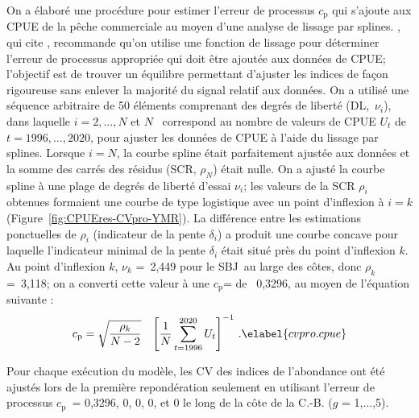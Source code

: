 \documentclass[11pt]{book}
\def\vsd{\vspace*{1ex}}     %
\renewcommand{\eb}{\vsd \vsd \begin{eqnarray}}
\renewcommand{\ee}{\end{eqnarray} \vsd }
\begin{document}
On a \'{e}labor\'{e} une proc\'{e}dure pour estimer l'erreur de processus $c_\text{p}$ qui s'ajoute aux CPUE de la p\^{e}che commerciale au moyen d'une analyse de lissage par splines.
\citet{Francis:2011}, qui cite \citet{Clark-Hare:2006}, recommande qu'on utilise une fonction de lissage pour d\'{e}terminer l'erreur de processus appropri\'{e}e qui doit \^{e}tre ajout\'{e}e aux donn\'{e}es de CPUE; l'objectif est de trouver un \'{e}quilibre permettant d'ajuster les indices de fa\c{c}on rigoureuse sans enlever la majorit\'{e} du signal relatif aux donn\'{e}es.
On a utilis\'{e} une s\'{e}quence arbitraire de 50 \'{e}l\'{e}ments comprenant des degr\'{e}s de libert\'{e} (DL,~$\nu_i$), dans laquelle $i = 2,...,N$ et $N$~ correspond au nombre de valeurs de CPUE $U_t$ de $t = 1996,...,2020$, pour ajuster les donn\'{e}es de CPUE \`{a} l'aide du lissage par splines.
Lorsque $i = N$, la courbe spline \'{e}tait parfaitement ajust\'{e}e aux donn\'{e}es et la somme des carr\'{e}s des r\'{e}sidus (SCR, $\rho_N$) \'{e}tait nulle.
On a ajust\'{e} la courbe spline \`{a} une plage de degr\'{e}s de libert\'{e} d'essai $\nu_i$; les valeurs de la SCR $\rho_i$ obtenues formaient une courbe de type logistique avec un point d'inflexion \`{a} $i = k$ (Figure~\ref{fig:CPUEres-CVpro-YMR}).
La diff\'{e}rence entre les estimations ponctuelles de $\rho_i$ (indicateur de la pente $\delta_i$) a produit une courbe concave pour laquelle l'indicateur minimal de la pente $\delta_i$ \'{e}tait situ\'{e} pr\`{e}s du point d'inflexion $k$.
Au point d'inflexion $k$, $\nu_k$ =~2,449 pour le SBJ~au large des c\^{o}tes, donc $\rho_k$ =~3,118; on a converti cette valeur \`{a} une $c_\text{p}$= de ~0,3296, au moyen de l'\'{e}quation suivante :
\vspace{-0.25\baselineskip}%
\eb
c_\text{p} = \sqrt{\dfrac{\rho_k}{N-2}}~~~{\left[ \dfrac{1}{N} \sum\limits_{t=1996}^{2020} U_t \right]}^{-1}~. \elabel{cvpro.cpue}
\ee

Pour chaque ex\'{e}cution du mod\`{e}le, les CV des indices de l'abondance ont \'{e}t\'{e} ajust\'{e}s lors de la premi\`{e}re repond\'{e}ration seulement en utilisant l'erreur de processus $c_\text{p}$~= 0,3296, 0, 0, 0, et 0 le long de la c\^{o}te de la C.-B. ($g$ = 1,...,5).

\graphicspath{{./french/}}  %
\end{document}
